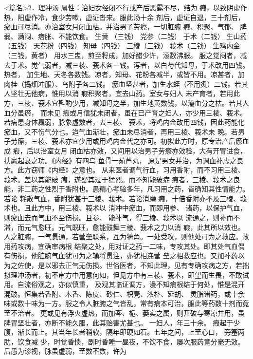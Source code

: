 \documentclass[a4paper,12pt,UTF8,twoside]{ctexbook}
\begin{document}
<篇名>2．理冲汤
属性：治妇女经闭不行或产后恶露不尽，结为 瘕，以致阴虚作热，阳虚作冷，食少劳嗽，虚证沓来。服此汤十余 
剂后，虚证自退，三十剂后，瘀血可尽消。亦治室女月闭血枯。并治男子劳瘵，一切脏腑 瘕、积聚、气郁、 
脾弱、满闷、痞胀、不能饮食。 
生黄 （三钱） 党参（二钱） 于术（二钱） 生山药（五钱） 天花粉（四钱） 知母（四钱） 
三棱（三钱） 莪术（三钱） 生鸡内金（三钱，黄者） 
用水三盅，煎至将成，加好醋少许，滚数沸服。 
服之觉闷者，减去于术。觉气弱者，减三棱、莪术各一钱。泻者，以白芍代知母，于术改用四钱。热者， 
加生地、天冬各数钱。凉者，知母、花粉各减半，或皆不用。凉甚者，加肉桂（捣细冲服）、乌附子各二钱。 
瘀血坚甚者，加生水蛭（不用炙）二钱。若其人坚壮无他病，惟用以消 瘕积聚者，宜去山药。室女与妇人 
未产育者，若用此方，三棱、莪术宜斟酌少用，减知母之半，加生地黄数钱，以濡血分之枯。若其人血分虽瘀， 
而未见 瘕或月信犹未闭者，虽在已产育之妇人，亦少用三棱、莪术。若病患身体羸弱，脉象虚数者，去三棱、 
莪术，将鸡内金改用四钱，因此药能化瘀血，又不伤气分也。迨气血渐壮，瘀血未尽消者，再用三棱、莪术未 
晚。若男子劳瘵，三棱、莪术亦宜少用或用鸡内金代之亦可。初拟此方时，原专治产后瘀血成 瘕，后以治室女月 
闭血枯亦效，又间用以治男子劳瘵亦效验，大有开胃进食，扶羸起衰之功。《内经》有四乌 鱼骨一茹芦丸， 
原是男女并治，为调血补虚之良方。此方窃师《内经》之意也。 
从来医者调气行血，习用香附，而不习用三棱、莪术。盖以其能破 瘕，遂疑其过于猛烈。而不知能破症 
瘕者，三棱、莪术之良能，非二药之性烈于香附也。愚精心考验多年，凡习用之药，皆确知其性情能力。若论 
耗散气血，香附犹甚于三棱、莪术。若论消磨 瘕，十倍香附亦不及三棱、莪术也。且此方中，用三棱、莪术以 
消冲中瘀血，而即用参、 诸药，以保护气血，则瘀血去而气血不至伤损。且参、 能补气，得三棱、莪术以 
流通之，则补而不滞，而元气愈旺。元气既旺，愈能鼓舞三棱、莪术之力以消 瘕，此其所以效也。 
人之脏腑，一气贯通，若营垒联系，互为犄角。一处受攻，则他处可为之救应。故用药攻病，宜确审病根 
结聚之处，用对证之药一二味，专攻其处。即其处气血偶有伤损，他脏腑气血犹可为之输将贯注，亦犹相连营 
垒之相救应也。又加补药以为之佐使，是以邪去正气无伤损。世俗医者，不知此理，见有专确攻病之方，若拙 
拟理冲汤者，初不审方中用意何如，但见方中有三棱、莪术，即望而生畏，不敢试用。自流俗观之，亦似慎重， 
及观其临证调方，漫不知病根结于何处，惟是混开混破。恒集若香附、木香、陈皮、砂仁、枳壳、浓朴、延胡、 
灵脂诸药，或十余味或数十味为一方。服之令人脏腑之气皆乱，常有病本可治，服此等药数十剂而竟至不治者。 
更或见有浮火虚热，而加芩、栀、蒌实之属，则开破与寒凉并用，虽脾胃坚壮者，亦断不能久服，此其贻害尤甚也。 
一妇人，年三十余。 瘕起于少腹，渐长而上。其当年长者稍软，隔年即硬如石。七年之间，上至心口， 
旁塞两肋，饮食减 
少，时觉昏愦，剧时昏睡一昼夜，不饮不食，屡次服药竟分毫无效。后愚为诊视，脉虽虚弱，至数不数，许为 
\end{document}
